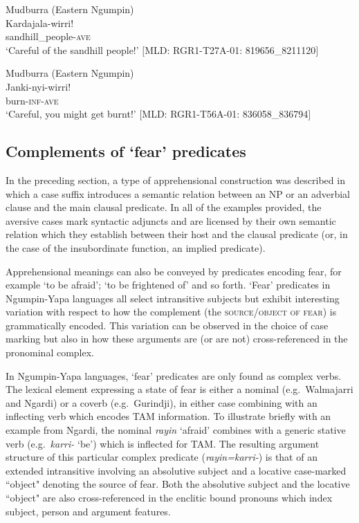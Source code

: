\documentclass[output=paper,colorlinks,citecolor=brown]{langscibook}
\begin{document}
\ea 
\textnormal{Mudburra (Eastern Ngumpin)} \\
\gll Kardajala-wirri! \\
sandhill\_people-\textsc{ave} \\
\glt `Careful of the sandhill people!' $[$MLD: RGR1-T27A-01: 819656\_8211120$]$
\label{ex:bro28}
\z

\ea 
\textnormal{Mudburra (Eastern Ngumpin)} \\
\gll Janki-nyi-wirri! \\
burn-\textsc{inf-ave} \\
\glt `Careful, you might get burnt!' $[$MLD: RGR1-T56A-01: 836058\_836794$]$
\label{ex:bro29}
\z


\subsection{Complements of `fear' predicates}
\label{subsec:complements}

In the preceding section, a type of apprehensional construction was described in which a case suffix introduces a semantic relation between an NP or an adverbial clause and the main clausal predicate. In all of the examples provided, the aversive cases mark syntactic adjuncts and are licensed by their own semantic relation which they establish between their host and the clausal predicate (or, in the case of the insubordinate function, an implied predicate).

Apprehensional meanings can also be conveyed by predicates encoding fear, for example `to be afraid'; `to be frightened of' and so forth. `Fear' predicates in Ngumpin-Yapa languages all select intransitive subjects but exhibit interesting variation with respect to how the complement (the \textsc{source/object of fear}) is grammatically encoded. This variation can be observed in the choice of case marking but also in how these arguments are (or are not) cross-referenced in the pronominal complex.

In Ngumpin-Yapa languages, `fear' predicates are only found as complex verbs. The lexical element expressing a state of fear is either a nominal (e.g.\  Walmajarri and Ngardi) or a coverb (e.g.\  Gurindji), in either case combining with an inflecting verb which encodes TAM information. To illustrate briefly with an example from Ngardi, the nominal \textit{rayin} `afraid' combines with a generic stative verb (e.g.\  \textit{karri-} `be') which is inflected for TAM. The resulting argument structure of this particular complex predicate (\textit{rayin=karri-}) is that of an extended intransitive involving an absolutive subject and a locative case-marked ``object" denoting the source of fear. Both the absolutive subject and the locative ``object" are also cross-referenced in the enclitic bound pronouns which index subject, person and argument features.
\end{document}
